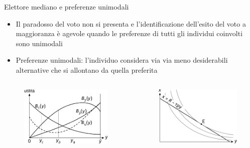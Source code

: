 \documentclass[11pt]{beamer}
\begin{document}
\begin{frame}{Elettore mediano e preferenze unimodali}
\begin{itemize}
\item Il paradosso del voto non si presenta e l'identificazione dell'esito del
voto a maggioranza è agevole quando le preferenze di tutti gli individui
coinvolti sono \alert{unimodali}
\item \alert{Preferenze unimodali}: l'individuo considera via via meno desiderabili
alternative che si allontano da quella preferita
\end{itemize}
\begin{columns}
\begin{column}{.5\columnwidth}
\begin{figure}[htbp]
\centering
\includegraphics[width=\textwidth]{./figure/elettore-mediano-1.pdf}
\end{figure}
\end{column}
\begin{column}{.5\columnwidth}
\begin{figure}[htbp]
\centering
\includegraphics[width=\textwidth]{./figure/elettore-mediano-3.pdf}
\end{figure}
\end{column}
\end{columns}
\end{frame}
\end{document}
